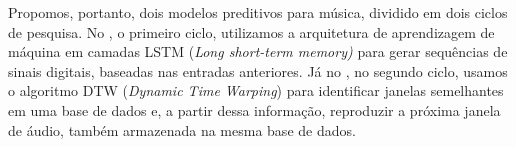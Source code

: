 Propomos, portanto, dois modelos preditivos para música, dividido em dois ciclos de pesquisa. No , o primeiro ciclo, utilizamos a arquitetura de aprendizagem de máquina em camadas LSTM (\textit{Long short-term memory)} \cite{lstm} para gerar sequências de sinais digitais, baseadas nas entradas anteriores. Já no , no segundo ciclo, usamos o algoritmo DTW (\textit{Dynamic Time Warping}) \cite{dtw} para identificar janelas semelhantes em uma base de dados e, a partir dessa informação, reproduzir a próxima janela de áudio, também armazenada na mesma base de dados.
